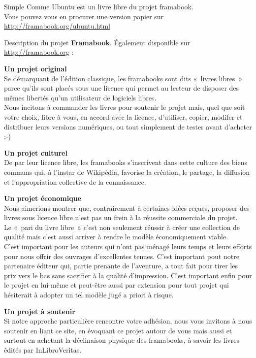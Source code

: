 \null{}
{\centering\fontsize{14}{16}\selectfont{}Simple Comme Ubuntu est un livre libre du projet framabook.\\
Vous pouvez vous en procurer une version papier sur\\\url{http://framabook.org/ubuntu.html}}\par
{\fontsize{12}{14}\selectfont{}Description du projet \textbf{Framabook}. Également disponible sur \url{http://framabook.org} :\par
\textbf{Un projet original}\\
Se démarquant de l'édition classique, les framabooks sont dits «~livres libres~» parce qu'ils sont placés sous une licence qui permet au lecteur de disposer des mêmes libertés qu'un utilisateur de logiciels libres.\\
Nous incitons à commander les livres pour soutenir le projet mais, quel que soit votre choix, libre à vous, en accord avec la licence, d'utiliser, copier, modifer et distribuer leurs versions numériques, ou tout simplement de tester avant d'acheter ;-)\par
\textbf{Un projet culturel}\\
De par leur licence libre, les framabooks s'inscrivent dans cette culture des biens communs qui, à l'instar de Wikipédia, favorise la création, le partage, la diffusion et l'appropriation collective de la connaissance.\par
\textbf{Un projet économique}\\
Nous aimerions montrer que, contrairement à certaines idées reçues, proposer des livres sous licence libre n'est pas un frein à la réussite commerciale du projet.\\
Le «~pari du livre libre~» c'est non seulement réussir à créer une collection de qualité mais c'est aussi arriver à rendre le modèle économiquement viable.\\
C'est important pour les auteurs qui n'ont pas ménagé leurs temps et leurs efforts pour nous offrir des ouvrages d'excellentes tenues. C'est important pout notre partenaire éditeur qui, partie prenante de l'aventure, a tout fait pour tirer les prix vers le bas sans sacrifier à la qualité d'impression. C'est important enfin pour le projet en lui-même et peut-être aussi par extension pour tout projet qui hésiterait à adopter un tel modèle jugé a priori à risque.\par
\textbf{Un projet à soutenir}\\
Si notre approche particulière rencontre votre adhésion, nous vous invitons à nous soutenir en liant ce site, en évoquant ce projet autour de vous mais aussi et surtout en achetant la déclinaison physique des framabooks, à savoir les livres édités par InLibroVeritas.\\
}
